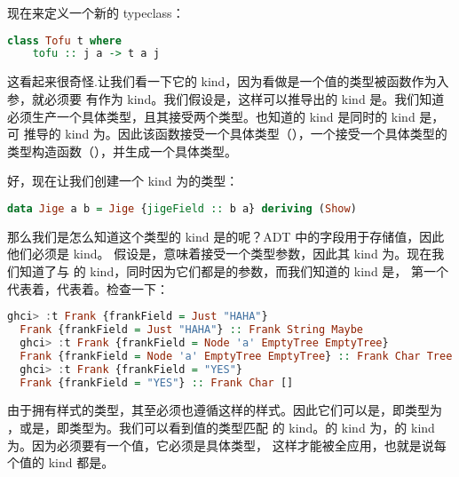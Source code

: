 \documentclass[./main.tex]{subfiles}
\begin{document}
现在来定义一个新的 typeclass：

\begin{lstlisting}[language=Haskell]
  class Tofu t where
    tofu :: j a -> t a j
\end{lstlisting}

这看起来很奇怪.让我们看一下它的 kind，因为看做是一个值的类型被函数作为入参，就必须要
有\acode{*}作为 kind。我们假设是\acode{*}，这样可以推导出的 kind 是\acode{* -> *}。我们知道
必须生产一个具体类型，且其接受两个类型。也知道的 kind 是\acode{*}同时的 kind 是\acode{* -> *}，可
推导的 kind 为\acode{* -> (* -> *) -> *}。因此该函数接受一个具体类型（），一个接受一个具体类型的
类型构造函数（），并生成一个具体类型。

好，现在让我们创建一个 kind 为\acode{* -> (* -> *) -> *}的类型：

\begin{lstlisting}[language=Haskell]
  data Jige a b = Jige {jigeField :: b a} deriving (Show)
\end{lstlisting}

那么我们是怎么知道这个类型的 kind 是\acode{* -> (* -> *) -> *}的呢？ADT 中的字段用于存储值，因此他们必须是\acode{*} kind。
假设是\acode{*}，意味着接受一个类型参数，因此其 kind 为\acode{* -> *}。现在我们知道了与
的 kind，同时因为它们都是的参数，而我们知道的 kind 是\acode{* -> (* -> *) -> *}，
第一个\acode{*}代表着，\acode{(* -> *)}代表着。检查一下：

\begin{lstlisting}[language=Haskell]
  ghci> :t Frank {frankField = Just "HAHA"}
  Frank {frankField = Just "HAHA"} :: Frank String Maybe
  ghci> :t Frank {frankField = Node 'a' EmptyTree EmptyTree}
  Frank {frankField = Node 'a' EmptyTree EmptyTree} :: Frank Char Tree
  ghci> :t Frank {frankField = "YES"}
  Frank {frankField = "YES"} :: Frank Char []
\end{lstlisting}

由于拥有样式的类型，其至必须也遵循这样的样式。因此它们可以是，即类型为
，或是\acode{["Y","E","S"]}，即类型为\acode{[Char]}。我们可以看到值的类型匹配
的 kind。\acode{[Char]}的 kind 为\acode{*}，的 kind 为\acode{* -> *}。因为必须要有一个值，它必须是具体类型，
这样才能被全应用，也就是说每个值的 kind 都是\acode{*}。
\end{document}
